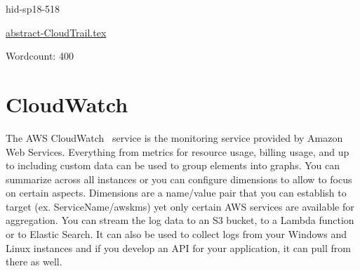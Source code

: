 


\begin{IU}

hid-sp18-518

\href{https://github.com/cloudmesh-community/hid-sp18-518/blob/master//technology/abstract-CloudTrail.tex}{abstract-CloudTrail.tex}

 

Wordcount: 400

\end{IU}

\section{CloudWatch}

The AWS CloudWatch~\cite{hid-sp18-518-CloudWatch} service is the monitoring 
service provided by Amazon Web Services. Everything from metrics for resource
usage, billing usage, and up to including custom data can be used to 
group elements into graphs. You can summarize across all instances or you
can configure dimensions to allow to focus on certain aspects. Dimensions are
a name/value pair that you can establish to target (ex. ServiceName/awskms) yet
only certain AWS services are available for aggregation. You can stream the 
log data to an S3 bucket, to a Lambda function or to Elastic Search. It can 
also be used to collect logs from your Windows and Linux instances and if
you develop an API for your application, it can pull from there as well.





